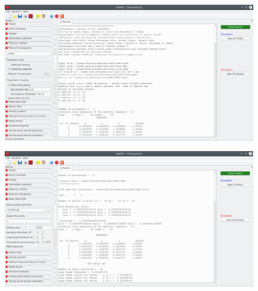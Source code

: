 \documentclass[a4paper,10pt]{article}
\begin{document}
\begin{minipage}{.5\linewidth}
\begin{figure}[H]
\caption{\label{fig:13}}
\begin{center}
\includegraphics[width=0.95\linewidth]{damqt_QS_fig13.png}
\end{center}
\end{figure} 
\end{minipage}
\begin{minipage}{.5\linewidth}
\begin{figure}[H]
\caption{\label{fig:14}}
\begin{center}
\includegraphics[width=0.95\linewidth]{damqt_QS_fig14.png}
\end{center}
\end{figure} 
\end{minipage}
\end{document}
